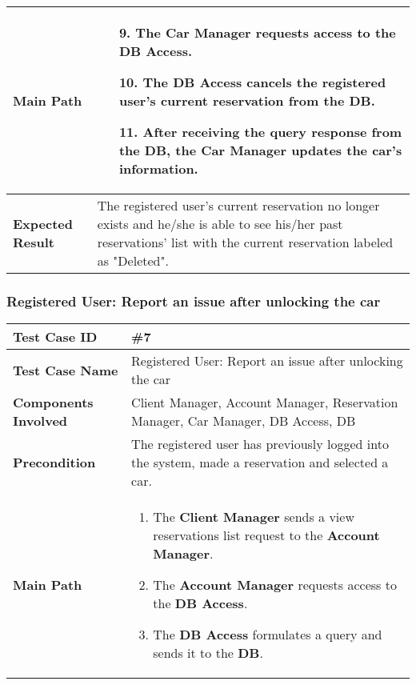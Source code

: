 \begin{center}
	\begin{tabular} { | m{4.5cm} | m{8.5cm} | }
		\textbf{Main Path} & 
		\begin{enumerate}
			\item [9.] The \textbf{Car Manager} requests access to the \textbf{DB Access}.
			\item [10.] The \textbf{DB Access} cancels the registered user's current reservation from the \textbf{DB}.
			\item [11.] After receiving the query response from the \textbf{DB}, the \textbf{Car Manager} updates the car's information.
		\end{enumerate}\\
		\hline
		\textbf{Expected Result} & The registered user's current reservation no longer exists and he/she is able to see his/her past reservations' list with the current reservation labeled as "Deleted".\\
		\hline
	\end{tabular}
\end{center}

\subsubsection{Registered User: Report an issue after unlocking the car}
\begin{center}
	\begin{tabular} { | m{4.5cm} | m{8.5cm} | }
		\hline
		\textbf{Test Case ID} & \#7\\
		\hline
		\textbf{Test Case Name} & Registered User: Report an issue after unlocking the car\\
		\hline
		\textbf{Components Involved} & Client Manager, Account Manager, Reservation Manager, Car Manager, DB Access, DB\\
		\hline
		\textbf{Precondition} & The registered user has previously logged into the system, made a reservation and selected a car.\\
		\hline 
		\textbf{Main Path} & 
		\begin{enumerate}
			\item The \textbf{Client Manager} sends a view reservations list request to the \textbf{Account Manager}.
			\item The \textbf{Account Manager} requests access to the \textbf{DB Access}.
			\item The \textbf{DB Access} formulates a query and sends it to the \textbf{DB}.
		\end{enumerate}\\
	\end{tabular}
\end{center}
			

